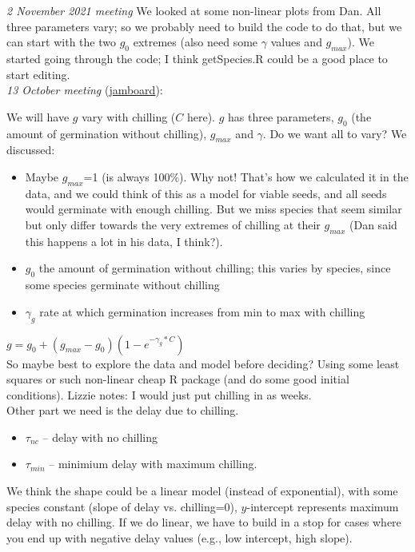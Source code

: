 \documentclass[11pt,letter]{article}
\begin{document}
\emph{2 November 2021 meeting} We looked at some non-linear plots from Dan. All three parameters vary; so we probably need to build the code to do that, but we can start with the two $g_0$ extremes (also need some $\gamma$ values and $g_{max}$). We started going through the code; I think getSpecies.R could be a good place to start editing.  \\

\emph{13 October meeting} (\href{https://jamboard.google.com/d/1jvab46saD2Dey8uOg-C_ruWeGzxKyXvdBScyxB5FUCk/viewer?f=0}{jamboard}): 

We will have $g$ vary with chilling ($C$ here). $g$ has three parameters, $g_0$ (the amount of germination without chilling), $g_{max}$ and $\gamma$. Do we want all to vary? We discussed:

\begin{itemize}
\item Maybe $g_{max}$=1 (is always 100\%). Why not! That's how we calculated it in the data, and we could think of this as a model for viable seeds, and all seeds would germinate with enough chilling. But we miss species that seem similar but only differ towards the very extremes of chilling at their $g_{max}$ (Dan said this happens a lot in his data, I think?).
\item $g_0$ the amount of germination without chilling; this varies by species, since some species germinate without chilling
\item $\gamma_g$ rate at which germination increases from min to max with chilling
\end{itemize}

$g=g_0 + (g_{max}-g_0)(1-e^{-\gamma_g*C})$ \\

So maybe best to explore the data and model before deciding? Using some least squares or such non-linear cheap R package (and do some good initial conditions). Lizzie notes: I would just put chilling in as weeks. \\

Other part we need is the delay due to chilling. 
\begin{itemize}
\item $\tau_{nc}$ -- delay with no chilling
\item $\tau_{min}$ -- minimium delay with maximum chilling.
\end{itemize}
We think the shape could be a linear model (instead of exponential), with some species constant (slope of delay vs. chilling=0), $y$-intercept represents maximum delay with no chilling. If we do linear, we have to build in a stop for cases where you end up with negative delay values (e.g., low intercept, high slope).\\
\end{document}
